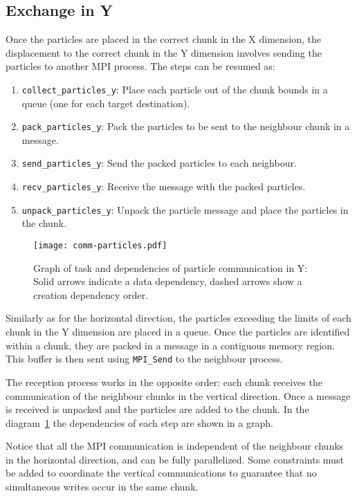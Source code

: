 \subsection{Exchange in Y}
Once the particles are placed in the correct chunk in the X dimension, the 
displacement to the correct chunk in the Y dimension involves sending the 
particles to another MPI process. The steps can be resumed as:
%
\begin{enumerate}
\item \texttt{collect\_particles\_y}: Place each particle out of the chunk 
bounds in a queue (one for each target destination).
\item \texttt{pack\_particles\_y}: Pack the particles to be sent to the 
neighbour chunk in a message.
\item \texttt{send\_particles\_y}: Send the packed particles to each neighbour.
\item \texttt{recv\_particles\_y}: Receive the message with the packed 
particles.
\item \texttt{unpack\_particles\_y}: Unpack the particle message and place the 
particles in the chunk.
\end{enumerate}
%
\begin{figure}
\centering
\texttt{[image: comm-particles.pdf]}
\caption{Graph of task and dependencies of particle communication in Y: Solid 
arrows indicate a data dependency, dashed arrows show a creation dependency 
order.}
\label{fig:comm_y}
\end{figure}
%
Similarly as for the horizontal direction, the particles exceeding the limits of 
each chunk in the Y dimension are placed in a queue.  Once the particles are 
identified within a chunk, they are packed in a message in a contiguous memory 
region. This buffer is then sent using \texttt{MPI\_Send} to the neighbour 
process.

The reception process works in the opposite order: each chunk receives the 
communication of the neighbour chunks in the vertical direction. Once a message 
is received is unpacked and the particles are added to the chunk. In the 
diagram~\ref{fig:comm_y} the dependencies of each step are shown in a graph.

Notice that all the MPI communication is independent of the neighbour chunks in 
the horizontal direction, and can be fully parallelized. Some constraints must 
be added to coordinate the vertical communications to guarantee that no 
simultaneous writes occur in the same chunk.

